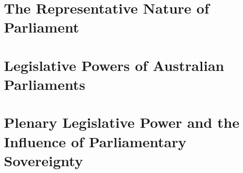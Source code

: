 \section{The Representative Nature of Parliament}

\section{Legislative Powers of Australian Parliaments}

\section{Plenary Legislative Power and the Influence of Parliamentary Sovereignty}